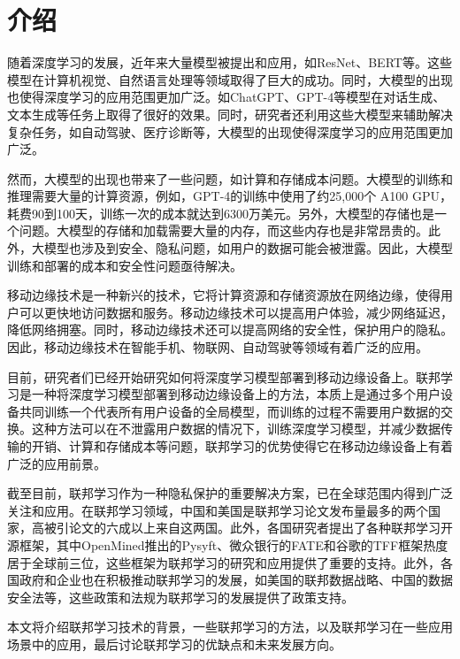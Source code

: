 \section{介绍}

随着深度学习的发展，近年来大量模型被提出和应用，如ResNet\cite{he2016deep}、BERT\cite{devlin2018bert}等。这些模型在计算机视觉、自然语言处理等领域取得了巨大的成功。同时，大模型的出现也使得深度学习的应用范围更加广泛。如ChatGPT、GPT-4等模型在对话生成、文本生成等任务上取得了很好的效果。同时，研究者还利用这些大模型来辅助解决复杂任务，如自动驾驶\cite{fu2024drive}、医疗诊断\cite{lievin2023can}等，大模型的出现使得深度学习的应用范围更加广泛。

然而，大模型的出现也带来了一些问题，如计算和存储成本问题。大模型的训练和推理需要大量的计算资源，例如，GPT-4的训练中使用了约25,000个 A100 GPU，耗费90到100天，训练一次的成本就达到6300万美元。另外，大模型的存储也是一个问题。大模型的存储和加载需要大量的内存，而这些内存也是非常昂贵的。此外，大模型也涉及到安全、隐私问题，如用户的数据可能会被泄露。因此，大模型训练和部署的成本和安全性问题亟待解决。

移动边缘技术\cite{mao2017survey,abbas2017mobile}是一种新兴的技术，它将计算资源和存储资源放在网络边缘，使得用户可以更快地访问数据和服务。移动边缘技术可以提高用户体验，减少网络延迟，降低网络拥塞。同时，移动边缘技术还可以提高网络的安全性，保护用户的隐私。因此，移动边缘技术在智能手机、物联网、自动驾驶等领域有着广泛的应用。

目前，研究者们已经开始研究如何将深度学习模型部署到移动边缘设备上。联邦学习\cite{zhang2021survey,mammen2021federated}是一种将深度学习模型部署到移动边缘设备上的方法，本质上是通过多个用户设备共同训练一个代表所有用户设备的全局模型，而训练的过程不需要用户数据的交换。这种方法可以在不泄露用户数据的情况下，训练深度学习模型，并减少数据传输的开销、计算和存储成本等问题，联邦学习的优势使得它在移动边缘设备上有着广泛的应用前景。

截至目前，联邦学习作为一种隐私保护的重要解决方案，已在全球范围内得到广泛关注和应用。在联邦学习领域，中国和美国是联邦学习论文发布量最多的两个国家，高被引论文的六成以上来自这两国。此外，各国研究者提出了各种联邦学习开源框架，其中OpenMined推出的Pysyft\cite{ziller2021pysyft}、微众银行的FATE\cite{kholod2020open}和谷歌的TFF框架热度居于全球前三位，这些框架为联邦学习的研究和应用提供了重要的支持。此外，各国政府和企业也在积极推动联邦学习的发展，如美国的联邦数据战略、中国的数据安全法等，这些政策和法规为联邦学习的发展提供了政策支持。

本文将介绍联邦学习技术的背景，一些联邦学习的方法，以及联邦学习在一些应用场景中的应用，最后讨论联邦学习的优缺点和未来发展方向。